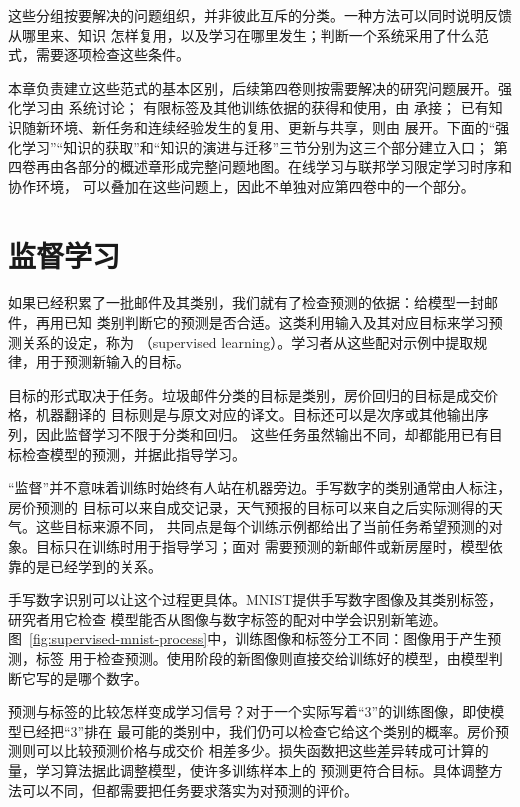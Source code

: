 这些分组按要解决的问题组织，并非彼此互斥的分类。一种方法可以同时说明反馈从哪里来、知识
怎样复用，以及学习在哪里发生；判断一个系统采用了什么范式，需要逐项检查这些条件。

本章负责建立这些范式的基本区别，后续第四卷则按需要解决的研究问题展开。强化学习由
系统讨论；
有限标签及其他训练依据的获得和使用，由
承接；
已有知识随新环境、新任务和连续经验发生的复用、更新与共享，则由
展开。下面的“强化学习”“知识的获取”和“知识的演进与迁移”三节分别为这三个部分建立入口；
第四卷再由各部分的概述章形成完整问题地图。在线学习与联邦学习限定学习时序和协作环境，
可以叠加在这些问题上，因此不单独对应第四卷中的一个部分。

\section{监督学习}
\label{sec:supervised-learning}

如果已经积累了一批邮件及其类别，我们就有了检查预测的依据：给模型一封邮件，再用已知
类别判断它的预测是否合适。这类利用输入及其对应目标来学习预测关系的设定，称为
（supervised learning）。学习者从这些配对示例中提取规律，用于预测新输入的目标。

目标的形式取决于任务。垃圾邮件分类的目标是类别，房价回归的目标是成交价格，机器翻译的
目标则是与原文对应的译文。目标还可以是次序或其他输出序列，因此监督学习不限于分类和回归。
这些任务虽然输出不同，却都能用已有目标检查模型的预测，并据此指导学习。

“监督”并不意味着训练时始终有人站在机器旁边。手写数字的类别通常由人标注，房价预测的
目标可以来自成交记录，天气预报的目标可以来自之后实际测得的天气。这些目标来源不同，
共同点是每个训练示例都给出了当前任务希望预测的对象。目标只在训练时用于指导学习；面对
需要预测的新邮件或新房屋时，模型依靠的是已经学到的关系。

手写数字识别可以让这个过程更具体。MNIST提供手写数字图像及其类别标签，研究者用它检查
模型能否从图像与数字标签的配对中学会识别新笔迹。
图~\ref{fig:supervised-mnist-process}中，训练图像和标签分工不同：图像用于产生预测，标签
用于检查预测。使用阶段的新图像则直接交给训练好的模型，由模型判断它写的是哪个数字。

预测与标签的比较怎样变成学习信号？对于一个实际写着“3”的训练图像，即使模型已经把“3”排在
最可能的类别中，我们仍可以检查它给这个类别的概率。房价预测则可以比较预测价格与成交价
相差多少。损失函数把这些差异转成可计算的量，学习算法据此调整模型，使许多训练样本上的
预测更符合目标。具体调整方法可以不同，但都需要把任务要求落实为对预测的评价。

